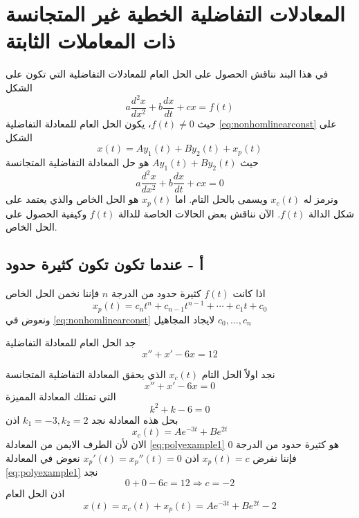 \section{المعادلات التفاضلية الخطية غير المتجانسة ذات المعاملات الثابتة}
في هذا البند نناقش الحصول على الحل العام للمعادلات التفاضلية التي تكون على الشكل
\begin{equation}
	\label{eq:nonhomlinearconst}
	a \frac{d^2 x}{dx^2} + b \frac{dx}{dt} + cx = f(t)
\end{equation}
حيث  $f(t) \neq 0$، يكون الحل العام للمعادلة التفاضلية \eqref{eq:nonhomlinearconst} على الشكل
\[
x(t) = A y_1(t) + B y_2(t) + x_p(t)
\]
حيث $A y_1(t) + By_2(t)$ هو حل المعادلة التفاضلية المتجانسة
\[
	a \frac{d^2 x}{dx^2} + b \frac{dx}{dt} + cx = 0
\]
ونرمز له $x_c(t)$ ويسمى بالحل التام. اما $x_p(t)$ هو الحل الخاص والذي يعتمد على شكل الدالة $f(t)$. الآن نناقش بعض الحالات الخاصة للدالة $f(t)$ وكيفية الحصول على الحل الخاص.

\subsection*{أ - عندما تكون  تكون كثيرة حدود}

اذا كانت $f(t)$ كثيرة حدود من الدرجة $n$ فإننا نخمن الحل الخاص
\[
x_p(t) = c_n t^n + c_{n-1} t^{n-1} + \cdots + c_1 t + c_0
\]
ونعوض في \eqref{eq:nonhomlinearconst} لايجاد المجاهيل $c_0,\dots,c_n$

\begin{example}
	جد الحل العام للمعادلة التفاضلية
	\begin{equation}
		\label{eq:polyexample1}
		x'' + x' - 6x = 12 
	\end{equation}
\end{example}
\begin{solution}
	نجد اولاً الحل التام $x_c(t)$ الذي يحقق المعادلة التفاضلية المتجانسة
	\[
		x'' + x' - 6x =0
	\]
	التي تمتلك المعادلة المميزة
	\[
	k^2 + k - 6 =0
	\]
	بحل هذه المعادلة نجد $k_1=-3,k_2=2 $ اذن
	\[
	x_c(t) = A e^{-3t} + B e^{2t}
	\]
	الان لأن الطرف الايمن من المعادلة \eqref{eq:polyexample1} هو كثيرة حدود من الدرجة 0 فإننا نفرض $x_p(t) = c$ اذن $x_p'(t) = x_p''(t) = 0$ نعوض في المعادلة \eqref{eq:polyexample1} نجد
	\[
	0 + 0 -6c = 12 \Rightarrow c = -2
	\]
	اذن الحل العام
	\[
	x(t) = x_c(t) + x_p(t) = A e^{-3t} + B e^{2t} -2
	\]
\end{solution}

